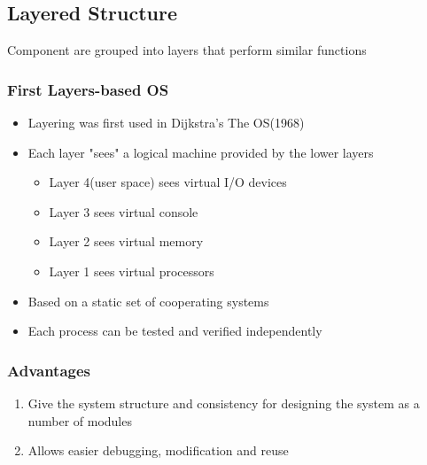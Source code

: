 \documentclass[11pt]{article}
\theoremstyle{definition}
\begin{document}
    \subsection{Layered Structure}
        Component are grouped into layers that perform similar functions
        \subsubsection{First Layers-based OS}
            \begin{itemize}
                \item Layering was first used in Dijkstra's The OS(1968)
                \item Each layer "sees" a logical machine provided by the lower layers
                      \begin{itemize}
                            \item Layer 4(user space) sees virtual I/O devices
                            \item Layer 3 sees virtual console
                            \item Layer 2 sees virtual memory
                            \item Layer 1 sees virtual processors
                        \end{itemize}
                \item Based on a static set of cooperating systems
                \item Each process can be tested and verified independently
            \end{itemize}
        \subsubsection{Advantages}
            \begin{enumerate}
                \item Give the system structure and consistency for designing the system as a number of modules
                \item Allows easier debugging, modification and reuse
            \end{enumerate}
\end{document}
